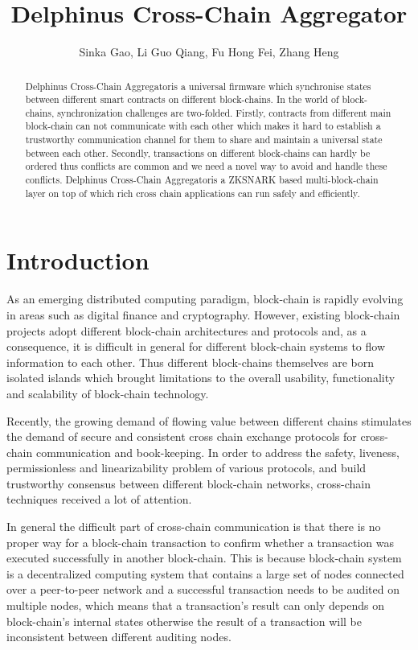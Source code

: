 \documentclass[pageno]{jpaper}
\begin{document}
\title{Delphinus Cross-Chain Aggregator}
\author{Sinka Gao, Li Guo Qiang, Fu Hong Fei, Zhang Heng}
\newcommand{\dprotocol}{Delphinus Cross-Chain Aggregator}
\date{}
\maketitle
\thispagestyle{empty}
\begin{abstract}
\dprotocol is a universal firmware which synchronise states between different smart contracts on different block-chains. In the world of block-chains, synchronization challenges are two-folded. Firstly, contracts from different main block-chain can not communicate with each other which makes it hard to establish a trustworthy communication channel for them to share and maintain a universal state between each other. Secondly, transactions on different block-chains can hardly be ordered thus conflicts are common and we need a novel way to avoid and handle these conflicts. \dprotocol is a ZKSNARK based multi-block-chain layer on top of which rich cross chain applications can run safely and efficiently.
\end{abstract}

\section{Introduction}
As an emerging distributed computing paradigm, block-chain is rapidly evolving in areas such as digital finance and cryptography. However, existing block-chain projects adopt different block-chain architectures and protocols and, as a consequence, it is difficult in general for different block-chain systems to flow information to each other. Thus different block-chains themselves are born isolated islands which brought limitations to the overall usability, functionality and scalability of block-chain technology. \cite{anati2013innovative}

Recently, the growing demand of flowing value between different chains stimulates the demand of secure and consistent cross chain exchange protocols for cross-chain communication and book-keeping.  In order to address the safety, liveness, permissionless and linearizability problem of various protocols, and build trustworthy consensus between different block-chain networks, cross-chain techniques received a lot of attention.

In general the difficult part of cross-chain communication is that there is no proper way for a block-chain transaction to confirm whether a transaction was executed successfully in another block-chain. This is because block-chain system is a decentralized computing system that contains a large set of nodes connected over a peer-to-peer network and a successful transaction needs to be audited on multiple nodes, which means that a transaction's result can only depends on block-chain's internal states otherwise the result of a transaction will be inconsistent between different auditing nodes. 
\end{document}
